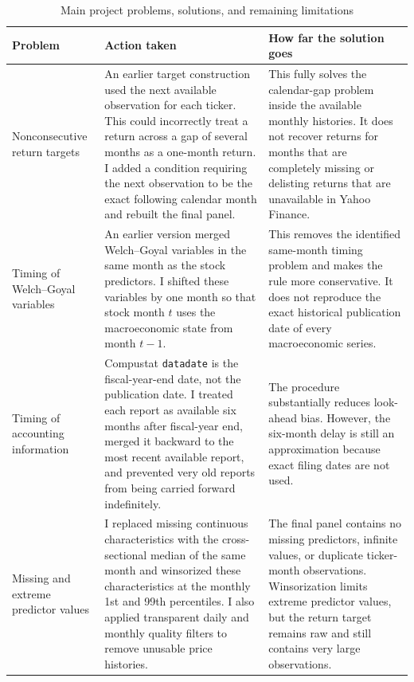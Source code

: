 \documentclass[11pt,a4paper]{article}
\begin{document}
\begin{table}[H]
\centering
\caption{Main project problems, solutions, and remaining limitations}
\label{tab:problems-solutions}

\footnotesize
\setlength{\tabcolsep}{4pt}

\begin{tabularx}
{\textwidth}
{>{\raggedright\arraybackslash}p{2.8cm}
 >{\raggedright\arraybackslash}X
 >{\raggedright\arraybackslash}X}
\toprule
Problem
& Action taken
& How far the solution goes \\
\midrule

Nonconsecutive return targets
&
An earlier target construction used the next available observation for each
ticker. This could incorrectly treat a return across a gap of several months as
a one-month return. I added a condition requiring the next observation to be
the exact following calendar month and rebuilt the final panel.
&
This fully solves the calendar-gap problem inside the available monthly
histories. It does not recover returns for months that are completely missing or
delisting returns that are unavailable in Yahoo Finance.
\\[0.3em]

Timing of Welch--Goyal variables
&
An earlier version merged Welch--Goyal variables in the same month as the
stock predictors. I shifted these variables by one month so that stock month
\(t\) uses the macroeconomic state from month \(t-1\).
&
This removes the identified same-month timing problem and makes the rule more
conservative. It does not reproduce the exact historical publication date of
every macroeconomic series.
\\[0.3em]

Timing of accounting information
&
Compustat \texttt{datadate} is the fiscal-year-end date, not the publication
date. I treated each report as available six months after fiscal-year end,
merged it backward to the most recent available report, and prevented very old
reports from being carried forward indefinitely.
&
The procedure substantially reduces look-ahead bias. However, the six-month
delay is still an approximation because exact filing dates are not used.
\\[0.3em]

Missing and extreme predictor values
&
I replaced missing continuous characteristics with the cross-sectional median
of the same month and winsorized these characteristics at the monthly 1st and
99th percentiles. I also applied transparent daily and monthly quality filters
to remove unusable price histories.
&
The final panel contains no missing predictors, infinite values, or duplicate
ticker-month observations. Winsorization limits extreme predictor values, but
the return target remains raw and still contains very large observations.
\\[0.3em]


\end{tabularx}
\end{table}
\end{document}
